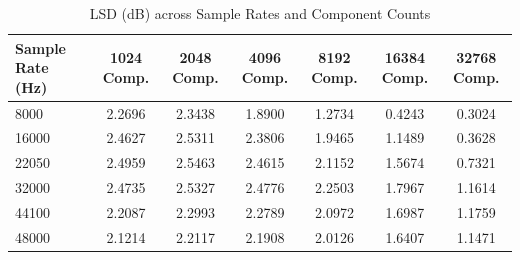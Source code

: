 \begin{table}[htbp]
\centering
\caption{LSD (dB) across Sample Rates and Component Counts}
\begin{tabular}{|l|c|c|c|c|c|c|}
\hline
Sample Rate (Hz) & 1024 Comp. & 2048 Comp. & 4096 Comp. & 8192 Comp. & 16384 Comp. & 32768 Comp. \\ \hline
8000 & 2.2696 & 2.3438 & 1.8900 & 1.2734 & 0.4243 & 0.3024 \\ \hline
16000 & 2.4627 & 2.5311 & 2.3806 & 1.9465 & 1.1489 & 0.3628 \\ \hline
22050 & 2.4959 & 2.5463 & 2.4615 & 2.1152 & 1.5674 & 0.7321 \\ \hline
32000 & 2.4735 & 2.5327 & 2.4776 & 2.2503 & 1.7967 & 1.1614 \\ \hline
44100 & 2.2087 & 2.2993 & 2.2789 & 2.0972 & 1.6987 & 1.1759 \\ \hline
48000 & 2.1214 & 2.2117 & 2.1908 & 2.0126 & 1.6407 & 1.1471 \\ \hline
\end{tabular}
\end{table}
